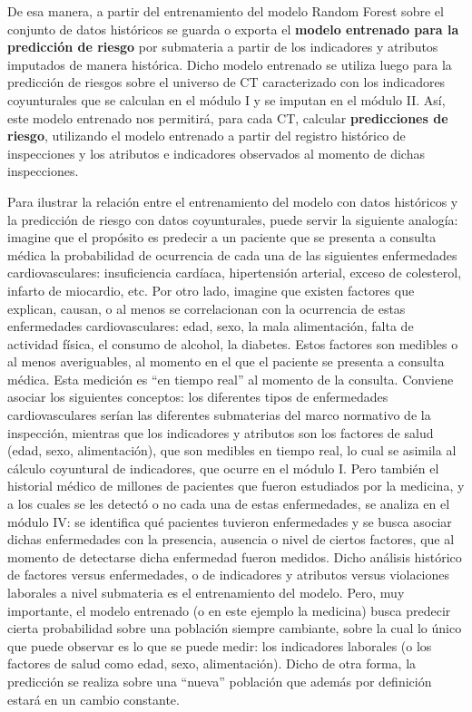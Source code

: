 \documentclass[
]{article}
\begin{document}
De esa manera, a partir del entrenamiento del modelo Random Forest sobre el conjunto de datos históricos se guarda o exporta el \textbf{modelo entrenado para la predicción de riesgo} por submateria a partir de los indicadores y atributos imputados de manera histórica. Dicho modelo entrenado se utiliza luego para la predicción de riesgos sobre el universo de CT caracterizado con los indicadores coyunturales que se calculan en el módulo I y se imputan en el módulo II. Así, este modelo entrenado nos permitirá, para cada CT, calcular \textbf{predicciones de riesgo}, utilizando el modelo entrenado a partir del registro histórico de inspecciones y los atributos e indicadores observados al momento de dichas inspecciones.

Para ilustrar la relación entre el entrenamiento del modelo con datos históricos y la predicción de riesgo con datos coyunturales, puede servir la siguiente analogía: imagine que el propósito es predecir a un paciente que se presenta a consulta médica la probabilidad de ocurrencia de cada una de las siguientes enfermedades cardiovasculares: insuficiencia cardíaca, hipertensión arterial, exceso de colesterol, infarto de miocardio, etc. Por otro lado, imagine que existen factores que explican, causan, o al menos se correlacionan con la ocurrencia de estas enfermedades cardiovasculares: edad, sexo, la mala alimentación, falta de actividad física, el consumo de alcohol, la diabetes. Estos factores son medibles o al menos averiguables, al momento en el que el paciente se presenta a consulta médica. Esta medición es ``en tiempo real'' al momento de la consulta. Conviene asociar los siguientes conceptos: los diferentes tipos de enfermedades cardiovasculares serían las diferentes submaterias del marco normativo de la inspección, mientras que los indicadores y atributos son los factores de salud (edad, sexo, alimentación), que son medibles en tiempo real, lo cual se asimila al cálculo coyuntural de indicadores, que ocurre en el módulo I. Pero también el historial médico de millones de pacientes que fueron estudiados por la medicina, y a los cuales se les detectó o no cada una de estas enfermedades, se analiza en el módulo IV: se identifica qué pacientes tuvieron enfermedades y se busca asociar dichas enfermedades con la presencia, ausencia o nivel de ciertos factores, que al momento de detectarse dicha enfermedad fueron medidos. Dicho análisis histórico de factores versus enfermedades, o de indicadores y atributos versus violaciones laborales a nivel submateria es el entrenamiento del modelo. Pero, muy importante, el modelo entrenado (o en este ejemplo la medicina) busca predecir cierta probabilidad sobre una población siempre cambiante, sobre la cual lo único que puede observar es lo que se puede medir: los indicadores laborales (o los factores de salud como edad, sexo, alimentación). Dicho de otra forma, la predicción se realiza sobre una ``nueva'' población que además por definición estará en un cambio constante.
\end{document}

